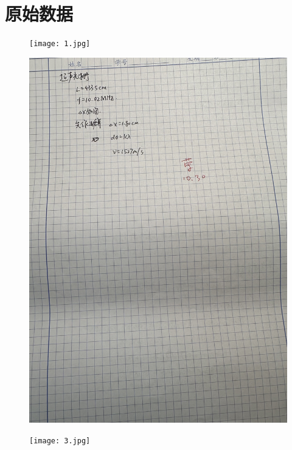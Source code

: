 \documentclass[a4paper]{ctexart}
\begin{document}
	\section{原始数据}
	\begin{figure}[H]
		\centering
		\texttt{[image: 1.jpg]}
	\end{figure}
	\begin{figure}[H]
	\centering
	\includegraphics[width=15cm]{2.jpg}
	\end{figure}
	\begin{figure}[H]
	\centering
	\texttt{[image: 3.jpg]}
	\end{figure}
\end{document}
